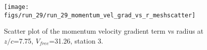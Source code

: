 \begin{figure}[H]
\centering
\texttt{[image: figs/run\_29/run\_29\_momentum\_vel\_grad\_vs\_r\_meshscatter]}
\caption{Scatter plot of the momentum velocity gradient term vs radius at $z/c$=7.75, $V_{free}$=31.26, station 3.}
\label{fig:run_29_momentum_vel_grad_vs_r_meshscatter}
\end{figure}


